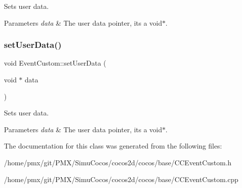 Sets user data.


\begin{DoxyParams}{Parameters}
{\em data} & The user data pointer, it\textquotesingle{}s a void$\ast$. \\
\hline
\end{DoxyParams}
\mbox{\label{classEventCustom_a63403ffc75d834cc39e405e7aa47aa3a}} 
\subsubsection{\texorpdfstring{set\+User\+Data()}{setUserData()}\hspace{0.1cm}{\footnotesize\ttfamily [2/2]}}
{\footnotesize\ttfamily void Event\+Custom\+::set\+User\+Data (\begin{DoxyParamCaption}\item[{void $\ast$}]{data }\end{DoxyParamCaption})\hspace{0.3cm}{\ttfamily [inline]}}

Sets user data.


\begin{DoxyParams}{Parameters}
{\em data} & The user data pointer, it\textquotesingle{}s a void$\ast$. \\
\hline
\end{DoxyParams}


The documentation for this class was generated from the following files\+:\begin{DoxyCompactItemize}
\item 
/home/pmx/git/\+P\+M\+X/\+Simu\+Cocos/cocos2d/cocos/base/C\+C\+Event\+Custom.\+h\item 
/home/pmx/git/\+P\+M\+X/\+Simu\+Cocos/cocos2d/cocos/base/C\+C\+Event\+Custom.\+cpp\end{DoxyCompactItemize}
